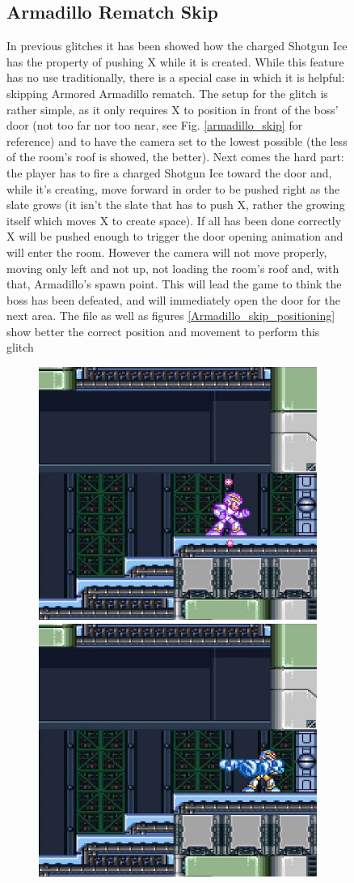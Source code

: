 \begin{figure}[htp]
\subsection{Armadillo Rematch Skip}\label{Armadillo_skip}
In previous glitches it has been showed how the charged Shotgun Ice has the property of pushing X while it is created. While this feature has no use traditionally, there is a special case in which it is helpful: skipping Armored Armadillo rematch. The setup for the glitch is rather simple, as it only requires X to position in front of the boss' door (not too far nor too near, see Fig. \ref{armadillo_skip} for reference) and to have the camera set to the lowest possible (the less of the room's roof is showed, the better). Next comes the hard part: the player has to fire a charged Shotgun Ice toward the door and, while it's creating, move forward in order to be pushed right as the slate grows (it isn't the slate that has to push X, rather the growing itself which moves X to create space). If all has been done correctly X will be pushed enough to trigger the door opening animation and will enter the room. However the camera will not move properly, moving only left and not up, not loading the room's roof and, with that, Armadillo's spawn point. This will lead the game to think the boss has been defeated, and will immediately open the door for the next area. The file  as well as figures \ref{Armadillo_skip_positioning} show better the correct position and movement to perform this glitch
\begin{figure}[htp]
	\centering
	\includegraphics[width=0.45\linewidth]{figures/X1/Miscs/Dillo_skip_1.jpg}
	\includegraphics[width=0.45\linewidth]{figures/X1/Miscs/Dillo_skip_2.jpg}

\end{figure}
\end{figure}
